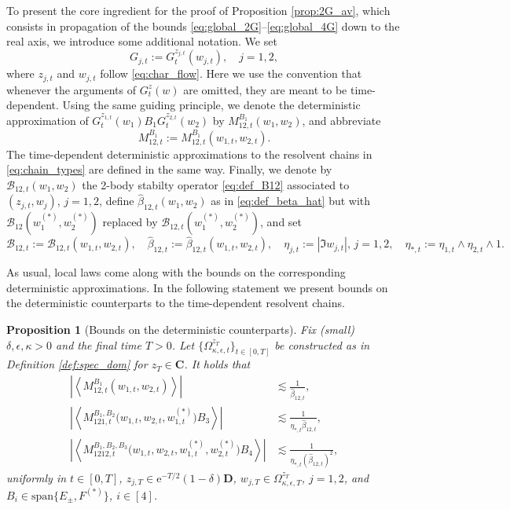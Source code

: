 \documentclass[10pt]{amsart}
\newtheorem{proposition}[theorem]{Proposition}
\numberwithin{equation}{section}
\newcommand{\C}{\mathbf{C}}
\newcommand{\ee}{\mathrm{e}}
\begin{document}
To present the core ingredient for the proof of Proposition \ref{prop:2G_av}, which consists in propagation of the bounds \eqref{eq:global_2G}--\eqref{eq:global_4G} down to the real axis, we introduce some additional notation. We set
\begin{equation}
G_{j,t}:=G^{z_{j,t}}_t(w_{j,t}),\quad j=1,2,
\label{eq:def_Gt}
\end{equation} 
where $z_{j,t}$ and $w_{j,t}$ follow \eqref{eq:char_flow}. Here we use the convention that whenever the arguments of $G^z_t(w)$ are omitted, they are meant to be time-dependent. Using the same guiding principle, we denote the deterministic approximation of $G^{z_{1,t}}_t(w_1)B_1G^{z_{2,t}}_t(w_2)$ by $M_{12,t}^{B_1}(w_1,w_2)$, and abbreviate
\begin{equation}
M_{12,t}^{B_1}:=M_{12,t}^{B_1}(w_{1,t},w_{2,t}).
\end{equation}
The time-dependent deterministic approximations to the resolvent chains in \eqref{eq:chain_types} are defined in the same way. Finally, we denote by $\mathcal{B}_{12,t}(w_1,w_2)$ the 2-body stabilty operator \eqref{eq:def_B12} associated to $(z_{j,t},w_j)$, $j=1,2$, define $\widehat{\beta}_{12,t}(w_1,w_2)$ as in \eqref{eq:def_beta_hat} but with $\mathcal{B}_{12}(w_1^{(*)},w_2^{(*)})$ replaced by $\mathcal{B}_{12,t}(w_1^{(*)},w_2^{(*)})$, and set
\begin{equation}
\mathcal{B}_{12,t}:=\mathcal{B}_{12,t}(w_{1,t},w_{2,t}),\quad\widehat{\beta}_{12,t}:=\widehat{\beta}_{12,t}(w_{1,t},w_{2,t}),\quad\eta_{j,t}:=|\Im w_{j,t}|,\,j=1,2,\quad \eta_{*,t}:=\eta_{1,t}\wedge\eta_{2,t}\wedge 1.\label{eq:control_param_t}
\end{equation}


As usual, local laws come along with the bounds on the corresponding deterministic approximations. In the following statement we present bounds on the deterministic counterparts to the time-dependent resolvent chains. 


\begin{proposition}[Bounds on the deterministic counterparts]\label{prop:M_bounds} Fix (small) $\delta, \epsilon, \kappa>0$ and the final time $T>0$. Let $\{\Omega_{\kappa,\epsilon,t}^{z_T}\}_{t\in[0,T]}$ be constructed as in Definition \ref{def:spec_dom} for $z_T\in\C$. It holds that
\begin{align}
\left\vert\left\langle M_{12,t}^{B_1}(w_{1,t},w_{2,t})\right\rangle\right\vert &\lesssim \frac{1}{\widehat{\beta}_{12,t}},\label{eq:M2_bound}\\
\left\vert\left\langle M_{121,t}^{B_1,B_2}\big(w_{1,t},w_{2,t},w_{1,t}^{(*)}\big)B_3\right\rangle\right\vert &\lesssim \frac{1}{\eta_{*,t}\widehat{\beta}_{12,t}},\label{eq:M3_bound}\\
\left\vert\left\langle M_{1212,t}^{B_1,B_2,B_3}\big(w_{1,t},w_{2,t},w_{1,t}^{(*)},w_{2,t}^{(*)}\big)B_4\right\rangle\right\vert&\lesssim \frac{1}{\eta_{*,t}(\widehat{\beta}_{12,t})^2},\label{eq:M4_bound}
\end{align}
uniformly in $t\in[0,T]$, $z_{j,T}\in \ee^{-T/2}(1-\delta)\mathbf{D}$, $w_{j,T}\in\Omega_{\kappa,\epsilon,T}^{z_T}$, $j=1,2$, and $B_i\in\mathrm{span}\{E_{\pm},F^{(*)}\}$, $i\in[4]$.
\end{proposition}
\end{document}
